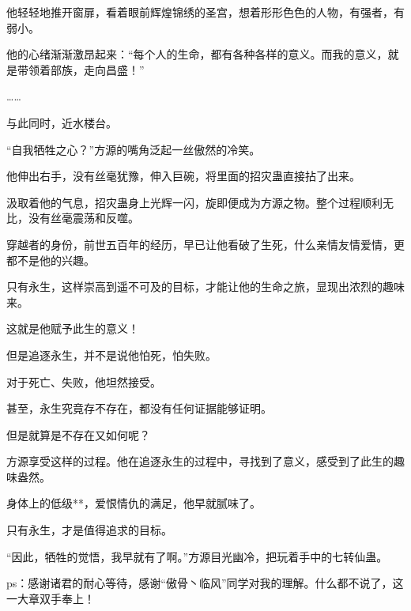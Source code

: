 \begin{this_body}
他轻轻地推开窗扉，看着眼前辉煌锦绣的圣宫，想着形形色色的人物，有强者，有弱小。

他的心绪渐渐激昂起来：“每个人的生命，都有各种各样的意义。而我的意义，就是带领着部族，走向昌盛！”

……

与此同时，近水楼台。

“自我牺牲之心？”方源的嘴角泛起一丝傲然的冷笑。

他伸出右手，没有丝毫犹豫，伸入巨碗，将里面的招灾蛊直接拈了出来。

汲取着他的气息，招灾蛊身上光辉一闪，旋即便成为方源之物。整个过程顺利无比，没有丝毫震荡和反噬。

穿越者的身份，前世五百年的经历，早已让他看破了生死，什么亲情友情爱情，更都不是他的兴趣。

只有永生，这样崇高到遥不可及的目标，才能让他的生命之旅，显现出浓烈的趣味来。

这就是他赋予此生的意义！

但是追逐永生，并不是说他怕死，怕失败。

对于死亡、失败，他坦然接受。

甚至，永生究竟存不存在，都没有任何证据能够证明。

但是就算是不存在又如何呢？

方源享受这样的过程。他在追逐永生的过程中，寻找到了意义，感受到了此生的趣味盎然。

身体上的低级**，爱恨情仇的满足，他早就腻味了。

只有永生，才是值得追求的目标。

“因此，牺牲的觉悟，我早就有了啊。”方源目光幽冷，把玩着手中的七转仙蛊。

ps：感谢诸君的耐心等待，感谢“傲骨丶临风”同学对我的理解。什么都不说了，这一大章双手奉上！

\end{this_body}

